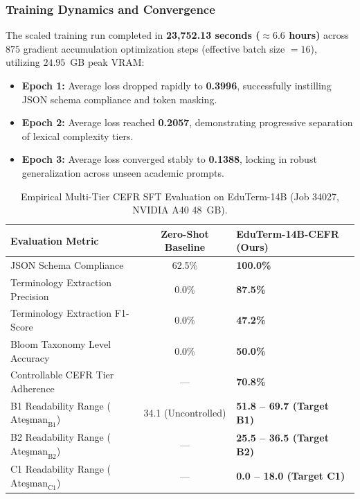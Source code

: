 \documentclass[a4paper,12pt]{report}
\begin{document}
\subsubsection{Training Dynamics and Convergence}
The scaled training run completed in \textbf{23,752.13 seconds ($\approx 6.6$ hours)} across $875$ gradient accumulation optimization steps (effective batch size $= 16$), utilizing $24.95$~GB peak VRAM:
\begin{itemize}
    \item \textbf{Epoch 1:} Average loss dropped rapidly to \textbf{0.3996}, successfully instilling JSON schema compliance and token masking.
    \item \textbf{Epoch 2:} Average loss reached \textbf{0.2057}, demonstrating progressive separation of lexical complexity tiers.
    \item \textbf{Epoch 3:} Average loss converged stably to \textbf{0.1388}, locking in robust generalization across unseen academic prompts.
\end{itemize}

\begin{table}[htbp]
\centering
\caption{Empirical Multi-Tier CEFR SFT Evaluation on EduTerm-14B (Job 34027, NVIDIA A40 48~GB).}
\label{tab:cefr_14b_results}
\footnotesize\setlength{\tabcolsep}{3pt}
\begin{tabularx}{\textwidth}{>{\RaggedRight\arraybackslash}X c >{\RaggedRight\arraybackslash}X}
\toprule
\textbf{Evaluation Metric} & \textbf{Zero-Shot Baseline} & \textbf{EduTerm-14B-CEFR (Ours)} \\
\midrule
JSON Schema Compliance & 62.5\% & \textbf{100.0\%} \\
Terminology Extraction Precision & 0.0\% & \textbf{87.5\%} \\
Terminology Extraction F1-Score & 0.0\% & \textbf{47.2\%} \\
Bloom Taxonomy Level Accuracy & 0.0\% & \textbf{50.0\%} \\
Controllable CEFR Tier Adherence & --- & \textbf{70.8\%} \\
B1 Readability Range ($\text{Ate\c{s}man}_{\text{B1}}$) & 34.1 (Uncontrolled) & \textbf{51.8 -- 69.7 (Target B1)} \\
B2 Readability Range ($\text{Ate\c{s}man}_{\text{B2}}$) & --- & \textbf{25.5 -- 36.5 (Target B2)} \\
C1 Readability Range ($\text{Ate\c{s}man}_{\text{C1}}$) & --- & \textbf{0.0 -- 18.0 (Target C1)} \\
\bottomrule
\end{tabularx}
\end{table}
\end{document}
